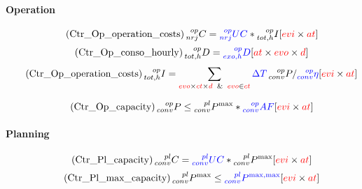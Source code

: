 \documentclass{article}
\makeatletter
\newcommand{\mathleft}{\@fleqntrue\@mathmargin0pt}
\makeatother
\begin{document}
\paragraph{Operation}
\mathleft
\begin{equation} \tag{Ctr\_Op\_operation\_costs}
    \prescript{op}{nrj}{C} = \textcolor{blue}{\textcolor{blue}{\prescript{op}{nrj}{UC}}}  *  \prescript{op}{tot,h}{I} \hfill [\textcolor{red}{evi}  \times \textcolor{red}{at}]
\label{eq:Ctr_Op_operation_costs}
\end{equation}
\begin{equation} \tag{Ctr\_Op\_conso\_hourly}
    \prescript{op}{tot,h}{D} = \textcolor{blue}{\prescript{op}{exo,h}{D}}  \hfill [\textcolor{red}{at} \times \textcolor{red}{evo} \times \textcolor{red}{d}]
\label{eq:Ctr_Op_conso_hourly}
\end{equation}
\begin{equation} \tag{Ctr\_Op\_operation\_costs}
    \prescript{op}{tot,h}{I} = \sum_{\textcolor{red}{evo} \times \textcolor{red}{ct}\times \textcolor{red}{d} \;\; \& \;\;\textcolor{red}{evo} \in \textcolor{red}{ct}} \textcolor{blue}{\Delta T } \prescript{op}{conv}{P} / \textcolor{blue}{\prescript{op}{conv}{\eta}} \hfill [\textcolor{red}{evi}  \times \textcolor{red}{at}]
\label{eq:Ctr_Op_conso_yearly_1}
\end{equation}


\begin{equation} \tag{Ctr\_Op\_capacity}
   \prescript{op}{conv}{P}  \leq  \prescript{pl}{conv}{P^{\max}} * \textcolor{blue}{\prescript{op}{conv}{AF}} \hfill [\textcolor{red}{evi}  \times \textcolor{red}{at}]
\label{eq:Ctr_Op_capacity}
\end{equation}

\paragraph{Planning}
\begin{equation} \tag{Ctr\_Pl\_capacity}
   \prescript{pl}{conv}{C} = \textcolor{blue}{\prescript{pl}{conv}{UC}}  *  \prescript{pl}{conv}{P^{\max}} \hfill [\textcolor{red}{evi}  \times \textcolor{red}{at}]
\label{eq:Ctr_Pl_capacity}
\end{equation}
\begin{equation} \tag{Ctr\_Pl\_max\_capacity}
   \prescript{pl}{conv}{P^{\max}}  \leq \textcolor{blue}{ \prescript{pl}{conv}{P}^{\max,\max}}    \hfill [\textcolor{red}{evi}  \times \textcolor{red}{at}]
\label{eq:Ctr_Pl_planning_max_capacity}
\end{equation}
\end{document}
